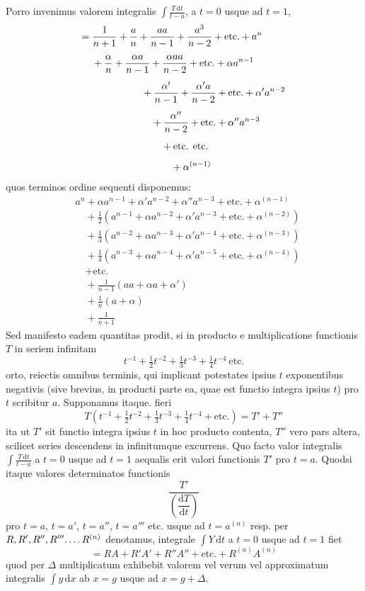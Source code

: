 Porro invenimus valorem integralis $\int\frac{T\,\mathrm{d}t}{t-a}$, a $t=0$ usque ad $t=1$,
\[
\begin{aligned}
={}&\frac{1}{n+1}+\frac{a}{n}+\frac{aa}{n-1}+\frac{a^3}{n-2}+\text{etc.}+a^n\\[4pt]
&+\frac{\alpha}{n}+\frac{\alpha a}{n-1}+\frac{\alpha aa}{n-2}+\text{etc.}+\alpha a^{n-1}\\[4pt]
&\hspace{5.01em}+\frac{\alpha'}{n-1}+\frac{\alpha'a}{n-2}+\text{etc.}+\alpha'a^{n-2}\\[4pt]
&\hspace{6.01em}+\frac{\alpha''}{n-2}+\text{etc.}+\alpha''a^{n-3}\\[4pt]
&\hspace{7.01em}+\text{etc. etc.}\\[4pt]
&\hspace{8.01em}+\alpha^{(n-1)}
\end{aligned}
\]
quos terminos ordine sequenti disponemus:
\[
\begin{aligned}
&a^n+\alpha a^{n-1}+\alpha'a^{n-2}+\alpha''a^{n-3}+\text{etc.}+\alpha^{(n-1)}\\[4pt]
&\quad+\tfrac12(a^{n-1}+\alpha a^{n-2}+\alpha'a^{n-3}+\text{etc.}+\alpha^{(n-2)})\\[4pt]
&\quad+\tfrac13(a^{n-2}+\alpha a^{n-3}+\alpha'a^{n-4}+\text{etc.}+\alpha^{(n-3)})\\[4pt]
&\quad+\tfrac14(a^{n-3}+\alpha a^{n-4}+\alpha'a^{n-5}+\text{etc.}+\alpha^{(n-4)})\\[4pt]
&\quad+\text{etc.}\\[4pt]
&\quad+\frac{1}{n-1}(aa+\alpha a+\alpha')\\[4pt]
&\quad+\frac{1}{n}(a+\alpha)\\[4pt]
&\quad+\frac{1}{n+1}
\end{aligned}
\]
Sed manifesto eadem quantitas prodit, si in producto e multiplicatione functionis
$T$ in seriem infinitam
\[
t^{-1}+\tfrac12t^{-2}+\tfrac13t^{-3}+\tfrac14t^{-4}\ \text{etc.}
\]
orto, reiectis omnibus terminis, qui implicant potestates ipsius $t$ exponentibus
negativis (sive brevius, in producti parte ea, quae est functio integra ipsius $t$)
pro $t$ scribitur $a$. Supponamus itaque. fieri
\[
T(t^{-1}+\tfrac12t^{-2}+\tfrac13t^{-3}+\tfrac14t^{-4}+\text{etc.})=T'+T''
\]
ita ut $T'$ sit functio integra ipsius $t$ in hoc producto contenta, $T''$ vero pars
altera, scilicet series descendens in infinitumque excurrens. Quo facto valor integralis
$\int\frac{T\,\mathrm{d}t}{t-a}$ a $t=0$ usque ad $t=1$ aequalis erit valori functionis $T'$
pro $t=a$. Quodsi itaque valores determinatos functionis
\[
\frac{T'}{\left(\dfrac{\mathrm{d}T}{\mathrm{d}t}\right)}
\]
pro $t=a$, $t=a'$, $t=a''$, $t=a'''$ etc. usque ad $t=a^{(n)}$ resp. per
$R,R',R'',R'''\ldotp\ldotp\ldotp\ldotp R^{(n)}$ denotamus, integrale $\int Y\,\mathrm{d}t$ a $t=0$ usque ad $t=1$ fiet
\[
=RA+R'A'+R''A''+\text{etc.}+R^{(n)}A^{(n)}
\]
quod per $\Delta$ multiplicatum exhibebit valorem vel verum vel approximatum integralis
$\int y\,\mathrm{d}x$ ab $x=g$ usque ad $x=g+\Delta$.

